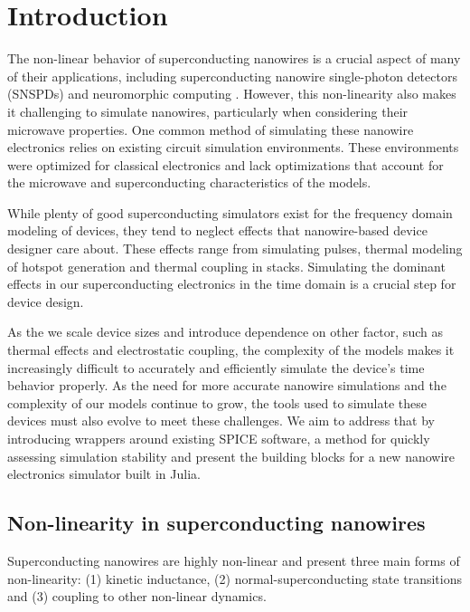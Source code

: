 \section{Introduction}

The non-linear behavior of superconducting nanowires is a crucial aspect of many of their applications, including superconducting nanowire single-photon detectors (SNSPDs) and neuromorphic computing \cite{snspd_original_paper, spiking_nn}. However, this non-linearity also makes it challenging to simulate nanowires, particularly when considering their microwave properties. One common method of simulating these nanowire electronics relies on existing circuit simulation environments. These environments were optimized for classical electronics and lack optimizations that account for the microwave and superconducting characteristics of the models.

While plenty of good superconducting simulators exist for the frequency domain
modeling of devices, they tend to neglect effects that nanowire-based device 
designer care about. These effects range from simulating pulses, thermal modeling
of hotspot generation and thermal coupling in stacks.
Simulating the dominant effects in our superconducting electronics in the time domain
is a crucial step for device design.

As the we scale device sizes and introduce dependence on other factor, such as thermal effects and electrostatic coupling, the complexity of the models makes it increasingly difficult to accurately and efficiently simulate the device's time behavior properly.
As the need for more accurate nanowire simulations and the complexity of our models continue to grow, the tools used to simulate these devices must also evolve to meet these challenges. We aim to address that
by introducing wrappers around existing SPICE software, a method for quickly
assessing simulation stability and present the building blocks for a new
nanowire electronics simulator built in Julia.

\subsection{Non-linearity in superconducting nanowires}\label{nonlinearity}

Superconducting nanowires are highly non-linear and present three main forms of non-linearity:
(1) kinetic inductance, (2) normal-superconducting state transitions and
(3) coupling to other non-linear dynamics.


